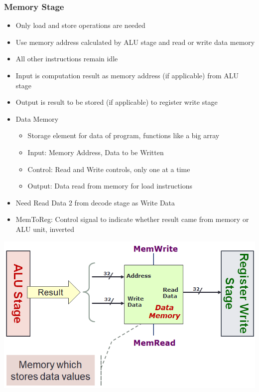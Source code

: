 \documentclass[10pt, portrait]{article}
\begin{document}
\begin{multicols*}{2}
\subsubsection{Memory Stage}
\begin{itemize}
    \item Only load and store operations are needed
    \item Use memory address calculated by ALU stage and read or write data memory
    \item All other instructions remain idle
    \item Input is computation result as memory address (if applicable) from ALU stage
    \item Output is result to be stored (if applicable) to register write stage
    \item Data Memory
    \begin{itemize}
        \item Storage element for data of program, functions like a big array
        \item Input: Memory Address, Data to be Written
        \item Control: Read and Write controls, only one at a time
        \item Output: Data read from memory for load instructions
    \end{itemize}
    \item Need Read Data 2 from decode stage as Write Data
    \item MemToReg: Control signal to indicate whether result came from memory or ALU unit, inverted
\end{itemize}
\begin{center}
    \includegraphics[width=0.7\linewidth]{memory.png}
\end{center}


\end{multicols*}
\end{document}
